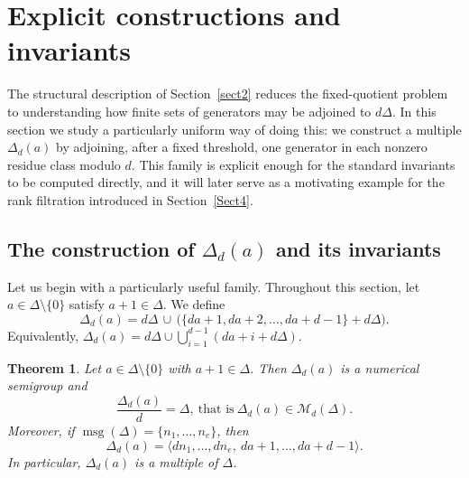 \documentclass[12pt,a4paper]{amsart}
\newtheorem{theorem}{Theorem}[section]
\theoremstyle{definition}
\theoremstyle{remark}
\begin{document}
\section{Explicit constructions and invariants}\label{Sect3}

The structural description of Section~\ref{sect2} reduces the fixed-quotient problem to
understanding how finite sets of generators may be adjoined to $d\Delta$. In this section
we study a particularly uniform way of doing this: we construct a multiple $\Delta_d(a)$ by adjoining, after a fixed threshold, one generator
in each nonzero residue class modulo $d$. This family is explicit enough for the standard
invariants to be computed directly, and it will later serve as a motivating example for the
rank filtration introduced in Section~\ref{Sect4}.

\subsection{\texorpdfstring{The construction of $\Delta_d(a)$ and its invariants}{The construction of Deltad(a) and its invariants}}

Let us begin with a particularly useful family. Throughout this section, let
\(a\in\Delta\setminus\{0\}\) satisfy \(a+1\in\Delta\). We define
\[
\Delta_d(a)= d\Delta \,\cup\, \bigl(\{da+1,da+2,\dots,da+d-1\}+d\Delta\bigr).
\]
Equivalently, $\Delta_d(a)= d\Delta \cup \bigcup_{i=1}^{d-1} (da+i+d\Delta)$.

\begin{theorem}\label{th:3.1}
Let $a\in \Delta\setminus\{0\}$ with $a+1\in \Delta$. Then $\Delta_d(a)$ is a numerical semigroup and
\[
\frac{\Delta_d(a)}{d}=\Delta,\ \text{that is}\ \Delta_d(a) \in \mathcal{M}_d(\Delta).
\]
Moreover, if $\operatorname{msg}(\Delta)=\{n_1,\dots,n_e\}$, then
\begin{equation}\label{ecu:msg}
\Delta_d(a)=\bigl\langle dn_1,\dots,dn_e,\ da+1,\dots,da+d-1\bigr\rangle.
\end{equation}
In particular, $\Delta_d(a)$ is a multiple of $\Delta$.
\end{theorem}
\end{document}
